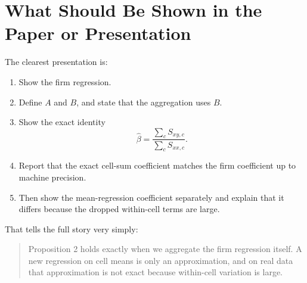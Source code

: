 \documentclass[11pt]{article}
\begin{document}
\section{What Should Be Shown in the Paper or Presentation}

The clearest presentation is:
\begin{enumerate}
  \item Show the firm regression.
  \item Define $A$ and $B$, and state that the aggregation uses $B$.
  \item Show the exact identity
  \[
  \hat\beta = \frac{\sum_c S_{xy,c}}{\sum_c S_{xx,c}}.
  \]
  \item Report that the exact cell-sum coefficient matches the firm coefficient up to machine precision.
  \item Then show the mean-regression coefficient separately and explain that it differs because the dropped within-cell terms are large.
\end{enumerate}

That tells the full story very simply:
\begin{quote}
Proposition 2 holds exactly when we aggregate the firm regression itself. A new regression on cell means is only an approximation, and on real data that approximation is not exact because within-cell variation is large.
\end{quote}
\end{document}
